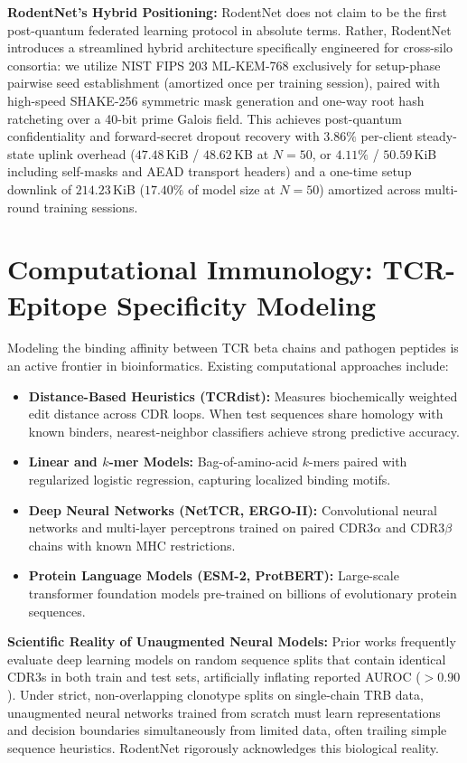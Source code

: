 \documentclass[11pt,a4paper]{report}
\begin{document}
\noindent\textbf{RodentNet's Hybrid Positioning:} RodentNet does not claim to be the first post-quantum federated learning protocol in absolute terms. Rather, RodentNet introduces a streamlined hybrid architecture specifically engineered for cross-silo consortia: we utilize NIST FIPS 203 ML-KEM-768 exclusively for setup-phase pairwise seed establishment (amortized once per training session), paired with high-speed SHAKE-256 symmetric mask generation and one-way root hash ratcheting over a 40-bit prime Galois field. This achieves post-quantum confidentiality and forward-secret dropout recovery with $3.86\%$ per-client steady-state uplink overhead ($47.48$\,KiB / $48.62$\,KB at $N=50$, or $4.11\%$ / $50.59$\,KiB including self-masks and AEAD transport headers) and a one-time setup downlink of $214.23$\,KiB ($17.40\%$ of model size at $N=50$) amortized across multi-round training sessions.

\section{Computational Immunology: TCR-Epitope Specificity Modeling}
Modeling the binding affinity between TCR beta chains and pathogen peptides is an active frontier in bioinformatics. Existing computational approaches include:
\begin{itemize}[itemsep=2pt]
  \item \textbf{Distance-Based Heuristics (TCRdist):} Measures biochemically weighted edit distance across CDR loops. When test sequences share homology with known binders, nearest-neighbor classifiers achieve strong predictive accuracy.
  \item \textbf{Linear and $k$-mer Models:} Bag-of-amino-acid $k$-mers paired with regularized logistic regression, capturing localized binding motifs.
  \item \textbf{Deep Neural Networks (NetTCR, ERGO-II):} Convolutional neural networks and multi-layer perceptrons trained on paired CDR3$\alpha$ and CDR3$\beta$ chains with known MHC restrictions.
  \item \textbf{Protein Language Models (ESM-2, ProtBERT):} Large-scale transformer foundation models pre-trained on billions of evolutionary protein sequences.
\end{itemize}

\noindent\textbf{Scientific Reality of Unaugmented Neural Models:} Prior works frequently evaluate deep learning models on random sequence splits that contain identical CDR3s in both train and test sets, artificially inflating reported AUROC ($>0.90$). Under strict, non-overlapping clonotype splits on single-chain TRB data, unaugmented neural networks trained from scratch must learn representations and decision boundaries simultaneously from limited data, often trailing simple sequence heuristics. RodentNet rigorously acknowledges this biological reality.
\end{document}
